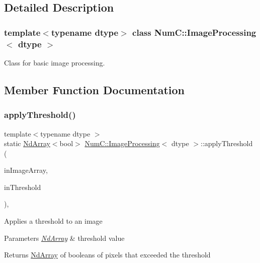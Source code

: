\subsection{Detailed Description}
\subsubsection*{template$<$typename dtype$>$\newline
class Num\+C\+::\+Image\+Processing$<$ dtype $>$}

Class for basic image processing. 

\subsection{Member Function Documentation}
\mbox{\label{class_num_c_1_1_image_processing_aded7e1bfe750f7cda5a896b629136d3a}} 
\subsubsection{\texorpdfstring{apply\+Threshold()}{applyThreshold()}}
{\footnotesize\ttfamily template$<$typename dtype $>$ \\
static \mbox{\hyperlink{class_num_c_1_1_nd_array}{Nd\+Array}}$<$bool$>$ \mbox{\hyperlink{class_num_c_1_1_image_processing}{Num\+C\+::\+Image\+Processing}}$<$ dtype $>$\+::apply\+Threshold (\begin{DoxyParamCaption}\item[{const \mbox{\hyperlink{class_num_c_1_1_nd_array}{Nd\+Array}}$<$ dtype $>$ \&}]{in\+Image\+Array,  }\item[{dtype}]{in\+Threshold }\end{DoxyParamCaption})\hspace{0.3cm}{\ttfamily [inline]}, {\ttfamily [static]}}

Applies a threshold to an image


\begin{DoxyParams}{Parameters}
{\em \mbox{\hyperlink{class_num_c_1_1_nd_array}{Nd\+Array}}} & threshold value \\
\hline
\end{DoxyParams}
\begin{DoxyReturn}{Returns}
\mbox{\hyperlink{class_num_c_1_1_nd_array}{Nd\+Array}} of booleans of pixels that exceeded the threshold 
\end{DoxyReturn}
\mbox{\label{class_num_c_1_1_image_processing_aff77622fa4d58b8e66a2e0b1fc75ff66}} 
